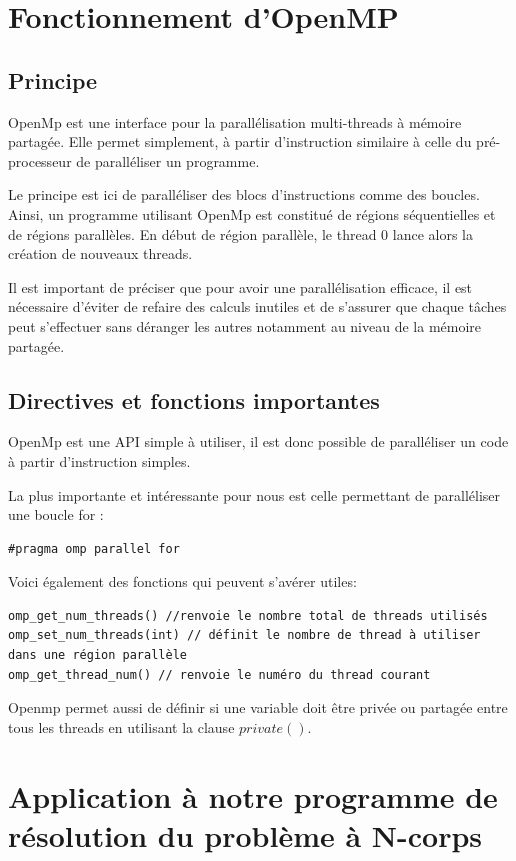 \section{Fonctionnement d'OpenMP}
\subsection{Principe}
OpenMp est une interface pour la parallélisation multi-threads à mémoire partagée. Elle permet simplement, à partir d'instruction similaire à celle du pré-processeur de paralléliser un programme.

Le principe est ici de paralléliser des blocs d'instructions comme des boucles. Ainsi, un programme utilisant OpenMp est constitué de régions séquentielles et de régions parallèles. En début de région parallèle, le thread 0 lance alors la création de nouveaux threads.

Il est important de préciser que pour avoir une parallélisation efficace, il est nécessaire d'éviter de refaire des calculs inutiles et de s'assurer que chaque tâches peut s'effectuer sans déranger les autres notamment au niveau de la mémoire partagée.

\subsection{Directives et fonctions importantes}
OpenMp est une API simple à utiliser, il est donc possible de paralléliser un code à partir d'instruction simples.

La plus importante et intéressante pour nous est celle permettant de paralléliser une boucle for :

\begin{lstlisting}
#pragma omp parallel for
\end{lstlisting}

Voici également des fonctions qui peuvent s'avérer utiles:

\begin{lstlisting}
omp_get_num_threads() //renvoie le nombre total de threads utilisés
omp_set_num_threads(int) // définit le nombre de thread à utiliser dans une région parallèle
omp_get_thread_num() // renvoie le numéro du thread courant
\end{lstlisting}

Openmp permet aussi de définir si une variable doit être privée ou partagée entre tous les threads en utilisant la clause $private()$.

\section{Application à notre programme de résolution du problème à N-corps}

